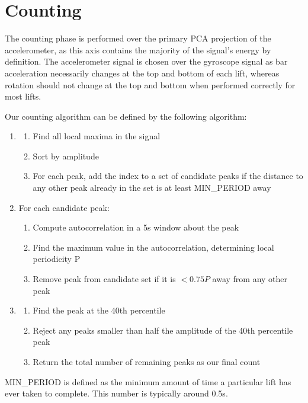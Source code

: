 \section{Counting}

The counting phase is performed over the primary PCA projection of the accelerometer, as this axis contains the majority of the signal's energy by definition. The accelerometer signal is chosen over the gyroscope signal as bar acceleration necessarily changes at the top and bottom of each lift, whereas rotation should not change at the top and bottom when performed correctly for most lifts.

Our counting algorithm can be defined by the following algorithm: 
\begin{enumerate}
    \item 
    \begin{enumerate}
        \item Find all local maxima in the signal
        \item Sort by amplitude
        \item For each peak, add the index to a set of candidate peaks if the distance to any other peak already in the set is at least MIN\_PERIOD away
    \end{enumerate}
    \item For each candidate peak:
    \begin{enumerate}
        \item Compute autocorrelation in a 5s window about the peak
        \item Find the maximum value in the autocorrelation, determining local periodicity P
        \item Remove peak from candidate set if it is $<0.75P$ away from any other peak
    \end{enumerate}
    \item 
    \begin{enumerate}
        \item Find the peak at the 40th percentile
        \item Reject any peaks smaller than half the amplitude of the 40th percentile peak
        \item Return the total number of remaining peaks as our final count
    \end{enumerate}
\end{enumerate}

MIN\_PERIOD is defined as the minimum amount of time a particular lift has ever taken to complete. This number is typically around 0.5s. 

